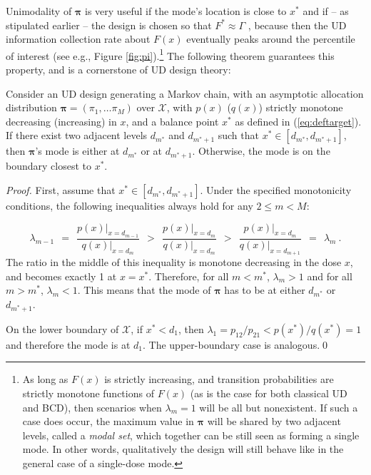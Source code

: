 Unimodality of $\boldsymbol{\pi}$ is very useful if the mode's location is close to $x^*$ and if -- as stipulated earlier -- the design is chosen so that $F^*\approx\Gamma$ , because then the UD information collection rate about $F(x)$ eventually peaks around the percentile of interest (see e.g., Figure \ref{fig:pi}).\footnote{As long as $F(x)$ is strictly increasing, and transition probabilities are strictly monotone functions of $F(x)$ (as is the case for both classical UD and BCD), then scenarios when $\lambda_m=1$ will be all but nonexistent. If such a case does occur, the maximum value in $\boldsymbol{\pi}$ will be shared by two adjacent levels, called a \emph{modal set}, which together can be still seen as forming a single mode. In other words, qualitatively the design will still behave like in the general case of a single-dose mode.} The following theorem guarantees this property, and is a cornerstone of UD design theory:

\begin{thm}\label{thm:mode} Consider an UD design generating a Markov chain, with an asymptotic allocation distribution $\boldsymbol{\pi}=\left(\pi_1,\ldots \pi_M\right)$ over $\mathcal{X}$, with $p(x)$ ($q(x)$) strictly monotone decreasing (increasing) in $x$, and a balance point $x^*$ as defined in (\ref{eq:deftarget}). If there exist two adjacent levels $d_{m^*}$ and $d_{m^*+1}$ such that $x^*\in\left[d_{m^*},d_{m^*+1}\right]$, then $\boldsymbol{\pi}$'s mode is either at $d_{m^*}$ or at $d_{m^*+1}$. Otherwise, the mode is on the boundary closest to $x^*$.
\end{thm}

\begin{proof} First, assume that $x^*\in\left[d_{m^*},d_{m^*+1}\right]$. Under the specified monotonicity conditions, the following inequalities always hold for any $2\leq m<M$:

\begin{equation}\label{eq:gammas1}
\lambda_{m-1}\ \ =\ \ \frac{p(x)\big |_{x=d_{m-1}}}{q(x)\big |_{x=d_m}}\ \ >\ \ \frac{p(x)\big |_{x=d_m}}{q(x)\big |_{x=d_{m}}}\ \ >\ \ \frac{p(x)\big |_{x=d_m}}{q(x)\big |_{x=d_{m+1}}}\ \ =\ \ \lambda_m\ .
\end{equation}
\noindent The ratio in the middle of this inequality is monotone decreasing in the dose $x$, and becomes exactly 1 at $x=x^*$. Therefore, for all $m<m^*$, $\lambda_m>1$ and for all $m>m^*$, $\lambda_m<1$. This means that the mode of $\boldsymbol{\pi}$ has to be at either $d_{m^*}$ or $d_{m^*+1}$.

\noindent On the lower boundary of $\mathcal{X}$, if $x^*<d_1$, then $\lambda_1=p_{12}/p_{21}<p\left(x^*\right)/q\left(x^*\right)=1$ and therefore the mode is at $d_1$. The upper-boundary case is analogous.\qed\end{proof}

